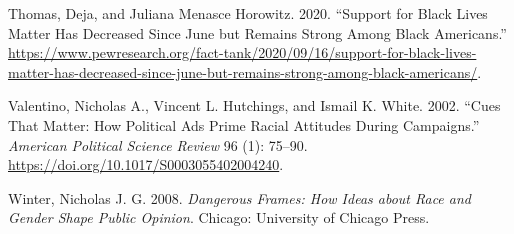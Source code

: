 \documentclass[
  12pt,
]{article}
\newlength{\cslhangindent}
\newlength{\cslentryspacingunit} %
\newenvironment{CSLReferences}[2] %
 {%
  \setlength{\parindent}{0pt}
  \ifodd #1
  \let\oldpar\par
  \def\par{\hangindent=\cslhangindent\oldpar}
  \fi
  \setlength{\parskip}{#2\cslentryspacingunit}
 }%
 {}
\begin{document}
\begin{CSLReferences}{1}{0}
\leavevmode{}%
Thomas, Deja, and Juliana Menasce Horowitz. 2020. {``Support for Black
Lives Matter Has Decreased Since June but Remains Strong Among Black
Americans.''}
\url{https://www.pewresearch.org/fact-tank/2020/09/16/support-for-black-lives-matter-has-decreased-since-june-but-remains-strong-among-black-americans/}.

\leavevmode{}%
Valentino, Nicholas A., Vincent L. Hutchings, and Ismail K. White. 2002.
{``Cues That Matter: How Political Ads Prime Racial Attitudes During
Campaigns.''} \emph{American Political Science Review} 96 (1): 75--90.
\url{https://doi.org/10.1017/S0003055402004240}.

\leavevmode{}%
Winter, Nicholas J. G. 2008. \emph{Dangerous Frames: How Ideas about
Race and Gender Shape Public Opinion}. Chicago: University of Chicago
Press.

\end{CSLReferences}
\end{document}
